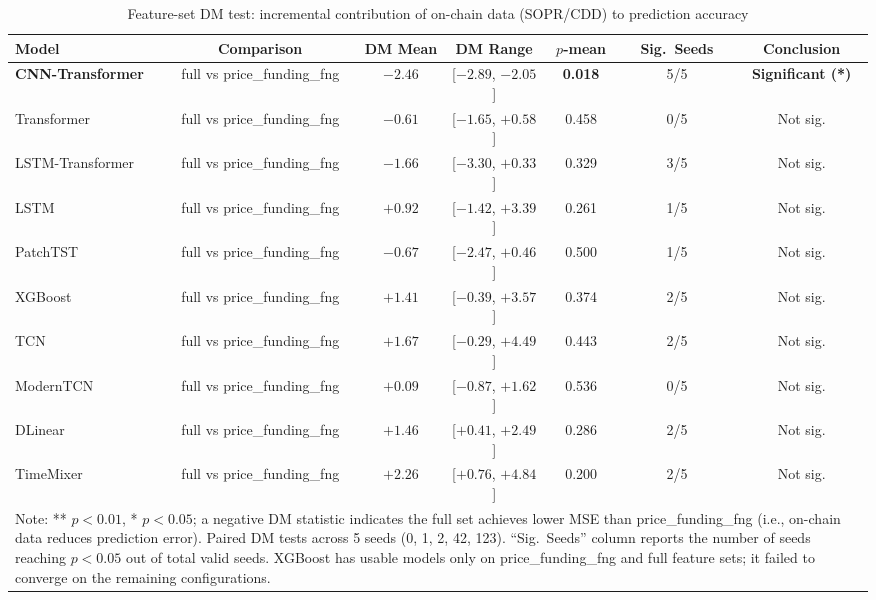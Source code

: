 \begin{table}[t]
\centering
\caption{Feature-set DM test: incremental contribution of on-chain data (SOPR/CDD) to prediction accuracy}
\label{tab:dm_feature_sets}
\footnotesize
\setlength{\tabcolsep}{3pt}
\begin{tabular}{lcccccc}
\toprule
Model & Comparison & DM Mean & DM Range & $p$-mean & Sig.\ Seeds & Conclusion \\
\midrule
\bfseries CNN-Transformer & full vs price\_funding\_fng & \bfseries $-2.46$ & [$-2.89$, $-2.05$] & \bfseries 0.018 & 5/5 & \bfseries Significant (*) \\
Transformer & full vs price\_funding\_fng & $-0.61$ & [$-1.65$, $+0.58$] & 0.458 & 0/5 & Not sig. \\
LSTM-Transformer & full vs price\_funding\_fng & $-1.66$ & [$-3.30$, $+0.33$] & 0.329 & 3/5 & Not sig. \\
LSTM & full vs price\_funding\_fng & $+0.92$ & [$-1.42$, $+3.39$] & 0.261 & 1/5 & Not sig. \\
PatchTST & full vs price\_funding\_fng & $-0.67$ & [$-2.47$, $+0.46$] & 0.500 & 1/5 & Not sig. \\
XGBoost & full vs price\_funding\_fng & $+1.41$ & [$-0.39$, $+3.57$] & 0.374 & 2/5 & Not sig. \\
TCN & full vs price\_funding\_fng & $+1.67$ & [$-0.29$, $+4.49$] & 0.443 & 2/5 & Not sig. \\
ModernTCN & full vs price\_funding\_fng & $+0.09$ & [$-0.87$, $+1.62$] & 0.536 & 0/5 & Not sig. \\
DLinear & full vs price\_funding\_fng & $+1.46$ & [$+0.41$, $+2.49$] & 0.286 & 2/5 & Not sig. \\
TimeMixer & full vs price\_funding\_fng & $+2.26$ & [$+0.76$, $+4.84$] & 0.200 & 2/5 & Not sig. \\
\bottomrule
\multicolumn{7}{p{0.85\textwidth}}{\footnotesize Note: ** $p<0.01$, * $p<0.05$; a negative DM statistic indicates the full set achieves lower MSE than price\_funding\_fng (i.e., on-chain data reduces prediction error). Paired DM tests across 5 seeds (0, 1, 2, 42, 123). ``Sig.\ Seeds'' column reports the number of seeds reaching $p<0.05$ out of total valid seeds. XGBoost has usable models only on price\_funding\_fng and full feature sets; it failed to converge on the remaining configurations.} \\
\end{tabular}
\end{table}

